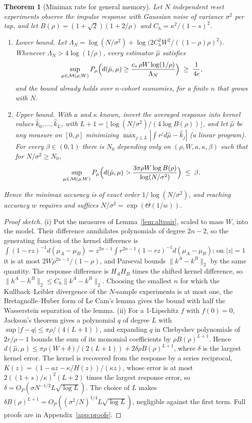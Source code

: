 \documentclass[12pt]{article}
\newtheorem{theorem}{Theorem}[section]
\theoremstyle{definition}
\theoremstyle{remark}
\begin{document}
\begin{theorem}[Minimax rate for general memory]\label{thm:general}
Let $N$ independent reset experiments observe the impulse response with Gaussian noise of variance $\sigma^2$ per tap, and let $B(\rho)=(1+\sqrt2)(1+2/\rho)$ and $C_h=\kappa^2/(1-s)^2$.
\begin{enumerate}[label=(\roman*)]
\item \emph{Lower bound.} Let $\Lambda_N=\log(N/\sigma^2)+\log\bigl(2C_h^2W^2/((1-\rho)\rho)^2\bigr)$. Whenever $\Lambda_N>4\log(1/\rho)$, every estimator $\hat\mu$ satisfies
\[
\sup_{\mu\in\mathcal M(\rho,W)}P_\mu\Bigl(d(\hat\mu,\mu)\ge\frac{c_*\,\rho W\log(1/\rho)}{\Lambda_N}\Bigr)\;\ge\;\frac1{4e},
\]
and the bound already holds over $n$-cohort economies, for a finite $n$ that grows with $N$.
\item \emph{Upper bound.} With $a$ and $\kappa$ known, invert the averaged response into kernel values $\hat k_0,\ldots,\hat k_L$, with $L+1=\lfloor\log(N/\sigma^2)/(4\log B(\rho))\rfloor$, and let $\hat\mu$ be any measure on $[0,\rho]$ minimizing $\max_{j\le L}|\int r^jd\hat\mu-\hat k_j|$ (a linear program). For every $\beta\in(0,1)$ there is $N_0$ depending only on $(\rho,W,a,\kappa,\beta)$ such that for $N/\sigma^2\ge N_0$,
\[
\sup_{\mu\in\mathcal M(\rho,W)}P_\mu\Bigl(d(\hat\mu,\mu)>\frac{3\pi\rho W\log B(\rho)}{\log(N/\sigma^2)}\Bigr)\;\le\;\beta .
\]
\end{enumerate}
Hence the minimax accuracy is of exact order $1/\log(N/\sigma^2)$, and reaching accuracy $w$ requires and suffices $N/\sigma^2=\exp(\Theta(1/w))$.
\end{theorem}

\begin{proof}[Proof sketch]
(i) Put the measures of Lemma~\ref{lem:altpair}, scaled to mass $W$, into the model. Their difference annihilates polynomials of degree $2n-2$, so the generating function of the kernel difference is $\int(1-rz)^{-1}d(\mu_A-\mu_B)=z^{2n-1}\int r^{2n-1}(1-rz)^{-1}d(\mu_A-\mu_B)$; on $|z|=1$ it is at most $2W\rho^{2n-1}/(1-\rho)$, and Parseval bounds $\|k^A-k^B\|_2$ by the same quantity. The response difference is $H_AH_B$ times the shifted kernel difference, so $\|h^A-h^B\|_2\le C_h\|k^A-k^B\|_2$. Choosing the smallest $n$ for which the Kullback--Leibler divergence of the $N$-sample experiments is at most one, the Bretagnolle--Huber form of Le Cam's lemma gives the bound with half the Wasserstein separation of the lemma. (ii) For a 1-Lipschitz $f$ with $f(0)=0$, Jackson's theorem gives a polynomial $q$ of degree $L$ with $\sup|f-q|\le\pi\rho/(4(L+1))$, and expanding $q$ in Chebyshev polynomials of $2r/\rho-1$ bounds the sum of its monomial coefficients by $\rho B(\rho)^{L+1}$. Hence $d(\hat\mu,\mu)\le\pi\rho(W+\delta)/(2(L+1))+2\delta\rho B(\rho)^{L+1}$, where $\delta$ is the largest kernel error. The kernel is recovered from the response by a series reciprocal, $K(z)=(1-az-\kappa/H(z))/(\kappa z)$, whose error is at most $2((1+s)/\kappa)^2(L+2)$ times the largest response error, so $\delta=O_P(\sigma N^{-1/2}L\sqrt{\log L})$. The choice of $L$ makes $\delta B(\rho)^{L+1}=O_P((\sigma^2/N)^{1/4}L\sqrt{\log L})$, negligible against the first term. Full proofs are in Appendix~\ref{app:proofs}.
\end{proof}
\end{document}
